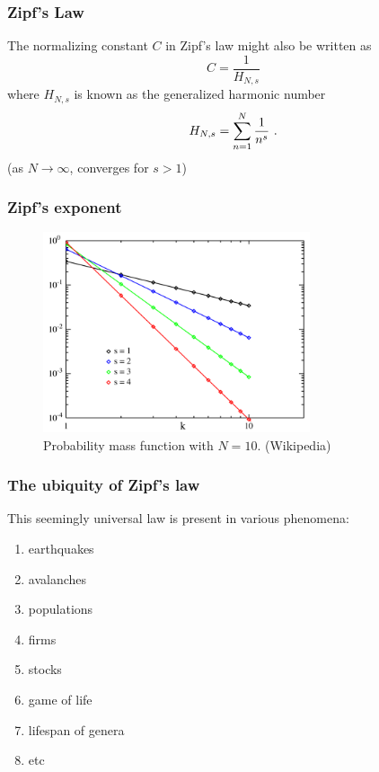 \documentclass[notes]{beamer}
\begin{document}
\frame
{
  \frametitle{Zipf's Law}
  The normalizing constant $C$ in Zipf's law might also be written as
  \begin{equation}
  C = \frac{1}{H_{N,s}} 
  \end{equation}
  where $H_{N,s}$ is known as the generalized harmonic number
  \begin{equation}
  H_{N,s} = \sum_{n=1}^{N} \frac{1}{n^s} \textmd{ .}
  \end{equation}
  (as $N \rightarrow \infty$, converges for $s>1$)
}



\frame
{
  \frametitle{Zipf's exponent}

  \begin{figure}[h!]
  \centering
  \includegraphics[width=0.7\textwidth]{images/zipfdistribution.png}
  \caption{Probability mass function with $N=10$. (Wikipedia)}
  \end{figure}
}


\frame
{
  \frametitle{The ubiquity of Zipf's law}
  
  This seemingly universal law is present in various phenomena:
  \begin{enumerate}
  \item earthquakes 
  \item avalanches
  \item populations
  \item firms
  \item stocks
  \item game of life
  \item lifespan of genera
  \item etc 
  \end{enumerate}
}
\end{document}
